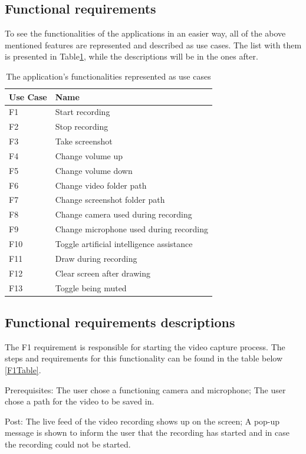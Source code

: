 \subsection{Functional requirements}
\label{sec:specssec1subsec1}

\par To see the functionalities of the applications in an easier way, all of the above mentioned features are represented and described as use cases. The list with them is presented in Table\ref{UseCaseTable}, while the descriptions will be in the ones after.

\begin{table}[htbp]
\begin{center}
\begin{tabular}
{|p{90pt}|p{270pt}|}
\hline
 Use Case & Name\\
\hline 
\hline F1 & Start recording \\
\hline F2 & Stop recording \\
\hline F3 & Take screenshot \\
\hline F4 & Change volume up \\
\hline F5 & Change volume down \\
\hline F6 & Change video folder path \\
\hline F7 & Change screenshot folder path \\
\hline F8 & Change camera used during recording \\
\hline F9 & Change microphone used during recording \\
\hline F10 & Toggle artificial intelligence assistance \\
\hline F11 & Draw during recording \\
\hline F12 & Clear screen after drawing \\
\hline F13 & Toggle being muted \\
\hline
\end{tabular}
\end{center}
\caption{The application's functionalities represented as use cases}
\label{UseCaseTable}
\end{table}

\subsection{Functional requirements descriptions}
\label{sec:specssec1subsec1d1}

\par The F1 requirement is responsible for starting the video capture process. The steps and requirements for this functionality can be found in the table below \ref{F1Table}.
\par Prerequisites: The user chose a functioning camera and microphone; The user chose a path for the video to be saved in.
\par Post: The live feed of the video recording shows up on the screen; A pop-up message is shown to inform the user that the recording has started and in case the recording could not be started.

